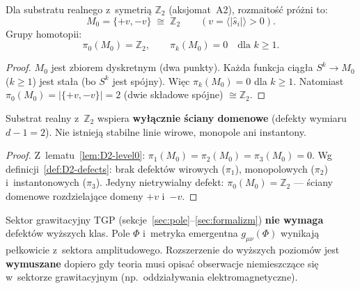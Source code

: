 \begin{lemma}\label{lem:D2-level0}
Dla substratu realnego z~symetri\k{a} $\mathbb{Z}_2$
(aksjomat~A2), rozmaito\'s\'c pr\'o\.zni to:
\begin{equation}\label{eq:D2-M0}
  M_0 = \{+v, -v\} \;\cong\; \mathbb{Z}_2
  \qquad (v = \langle|\hat{s}_i|\rangle > 0).
\end{equation}
Grupy homotopii:
\begin{equation}\label{eq:D2-pi-M0}
  \pi_0(M_0) = \mathbb{Z}_2,
  \qquad
  \pi_k(M_0) = 0 \quad \text{dla } k \geq 1.
\end{equation}
\end{lemma}

\begin{proof}
$M_0$ jest zbiorem dyskretnym (dwa punkty). Ka\.zda
funkcja ci\k{a}g\l{}a $S^k \to M_0$ ($k \geq 1$) jest
sta\l{}a (bo $S^k$ jest sp\'ojny). Wi\k{e}c
$\pi_k(M_0) = 0$ dla $k \geq 1$. Natomiast
$\pi_0(M_0) = |\{+v, -v\}| = 2$ (dwie sk\l{}adowe sp\'ojne)
$\cong \mathbb{Z}_2$.
\end{proof}

\begin{corollary}\label{cor:D2-level0-defects}
Substrat realny z~$\mathbb{Z}_2$ wspiera \textbf{wy\l{}\k{a}cznie
\'sciany domenowe} (defekty wymiaru $d{-}1 = 2$).
Nie istniej\k{a} stabilne linie wirowe, monopole ani instantony.
\end{corollary}

\begin{proof}
Z~lematu~\ref{lem:D2-level0}: $\pi_1(M_0) = \pi_2(M_0) = \pi_3(M_0) = 0$.
Wg definicji~\ref{def:D2-defects}: brak defekt\'ow wirowych
($\pi_1$), monopolowych ($\pi_2$) i~instantonowych ($\pi_3$).
Jedyny nietrywialny defekt: $\pi_0(M_0) = \mathbb{Z}_2$
--- \'sciany domenowe rozdzielaj\k{a}ce domeny $+v$ i~$-v$.
\end{proof}

\begin{remark}\label{rem:D2-level0-sufficiency}
Sektor grawitacyjny TGP (sekcje~\ref{sec:pole}--\ref{sec:formalizm})
\textbf{nie wymaga} defekt\'ow wy\.zszych klas.
Pole $\Phi$ i~metryka emergentna $g_{\mu\nu}(\Phi)$ wynikaj\k{a}
pe\l{}kowicie z~sektora amplitudowego.
Rozszerzenie do wy\.zszych poziom\'ow jest \textbf{wymuszane}
dopiero gdy teoria musi opisa\'c obserwacje niemieszcz\k{a}ce si\k{e}
w~sektorze grawitacyjnym (np.\ oddzia\l{}ywania elektromagnetyczne).
\end{remark}

